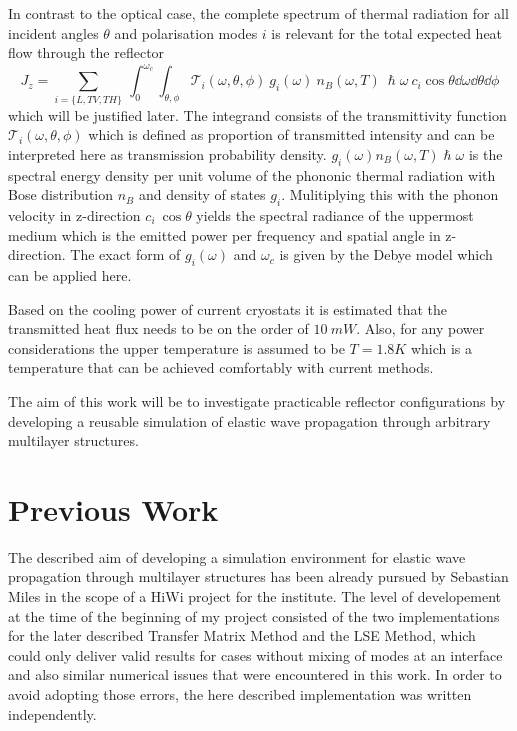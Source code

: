 In contrast to the optical case, the complete spectrum of thermal
radiation for all incident angles $\theta$ and polarisation modes $i$ is
relevant for the total expected heat flow through the reflector
\begin{equation} \label{eq:totalheatflow}
    J_z = \sum\limits_{i=\{L,TV,TH\}}\ \int_0^{\omega_c}\int_{\theta, \phi}
    \mathcal{T}_i(\omega, \theta, \phi)\ g_i(\omega)\ n_B(\omega, T)\
    \hslash \omega\  c_i\cos \theta \dd{\omega} \dd{\theta}\dd{\phi}
\end{equation}
which will be justified later. The integrand
consists of the transmittivity function $\mathcal{T}_i(\omega, \theta, \phi)$
which is defined as proportion of transmitted intensity and can be interpreted
here as transmission probability density. $g_i(\omega)
    n_B(\omega,T)\hslash\omega$ is the spectral energy density per unit volume
of the phononic thermal radiation with Bose distribution $n_B$ and density of
states $g_i$. Mulitiplying this with the phonon velocity in z-direction $c_i\
    \cos\theta$ yields the spectral radiance of the uppermost medium which is
the emitted power per frequency and spatial angle in z-direction. The exact
form of $g_i(\omega)$ and $\omega_c$ is given by the Debye model which can be
applied here.

Based on the cooling power of current cryostats it is estimated that the
transmitted heat flux needs to be on the order of $10\ \si{mW}$. Also,
for any power considerations the upper temperature is assumed to be
$T=1.8\si{K}$
which is a temperature that can be achieved comfortably with current methods.

The aim of this work will be to investigate practicable reflector
configurations by developing a reusable simulation of elastic wave propagation
through arbitrary multilayer structures.  %

\section{Previous Work}
The described aim of developing a simulation environment for elastic wave
propagation through multilayer structures has been already pursued by Sebastian
Miles in the scope of a HiWi project for the institute. The level of
developement at the time of the beginning of my project consisted of the two
implementations for the later described Transfer Matrix Method and the LSE
Method, which could only deliver valid results for cases without mixing of
modes at an interface and also similar numerical issues that were encountered
in this work. In order to avoid adopting those errors, the here described
implementation was written independently.

